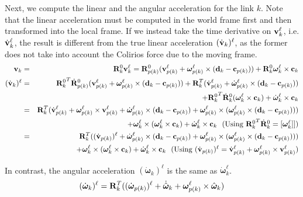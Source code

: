 Next, we compute the linear and the angular acceleration for the link
$k$. Note that the linear acceleration must be computed in the world
frame first and then transformed into the local frame. If we instead
take the time derivative on $\mathbf{v}_k^\ell$,
i.e. $\dot{\mathbf{v}}_k^\ell$, the result is different from the true
linear acceleration $(\dot{\mathbf{v}}_k)^\ell$, as the former does not
take into account the Colirios force due to the moving frame. 
\begin{eqnarray}
\mathbf{v}_k &=& \mathbf{R}^0_k \mathbf{v}_k^\ell = \mathbf{R}^0_{p(k)} (\mathbf{v}_{p(k)}^\ell + \bm{\omega}_{p(k)}^\ell \times
(\mathbf{d}_k -\mathbf{c}_{p(k)})) + \mathbf{R}^0_k \bm{\omega}_k^\ell \times
\mathbf{c}_k \nonumber \\
(\dot{\mathbf{v}}_k)^\ell &=& {\mathbf{R}^0_k}^T \dot{\mathbf{R}}^0_{p(k)}
(\mathbf{v}_{p(k)}^\ell + \bm{\omega}_{p(k)}^\ell \times (\mathbf{d}_k -
\mathbf{c}_{p(k)})) + \mathbf{R}_k^T (\dot{\mathbf{v}}_{p(k)}^\ell +
  \dot{\bm{\omega}}_{p(k)}^\ell \times (\mathbf{d}_k - \mathbf{c}_{p(k)}))
  \nonumber \\ &&+
  {\mathbf{R}^0_k}^T \dot{\mathbf{R}}^0_k (\bm{\omega}_k^\ell \times \mathbf{c}_k)
  + \dot{\bm{\omega}}_k^\ell \times \mathbf{c}_k \nonumber \\
&=& \mathbf{R}_k^T (\dot{\mathbf{v}}_{p(k)}^\ell +
\bm{\omega}_{p(k)}^\ell \times \mathbf{v}_{p(k)}^\ell + \dot{\bm{\omega}}_{p(k)}^\ell \times (\mathbf{d}_k - \mathbf{c}_{p(k)}) + \bm{\omega}_{p(k)}^\ell \times (\bm{\omega}_{p(k)}^\ell \times (\mathbf{d}_k -
\mathbf{c}_{p(k)}))) \nonumber \\ && + \bm{\omega}_k^\ell \times (\bm{\omega}_k^\ell
\times \mathbf{c}_k) + \dot{\bm{\omega}}_k^\ell \times \mathbf{c}_k \mbox{\ \
  (Using ${\mathbf{R}^0_k}^T \dot{\mathbf{R}}^0_k = [\bm{\omega}_k^\ell]]$)} \nonumber \\
&=& \mathbf{R}_k^T ((\dot{\mathbf{v}}_{p(k)})^\ell + \dot{\bm{\omega}}_{p(k)}^\ell \times (\mathbf{d}_k - \mathbf{c}_{p(k)}) + \bm{\omega}_{p(k)}^\ell \times (\bm{\omega}_{p(k)}^\ell \times (\mathbf{d}_k -
\mathbf{c}_{p(k)}))) \nonumber \\ && + \bm{\omega}_k^\ell \times (\bm{\omega}_k^\ell
\times \mathbf{c}_k) + \dot{\bm{\omega}}_k^\ell \times \mathbf{c}_k \mbox{\ \
  (Using ($\dot{\mathbf{v}}_{p(k)})^\ell = \dot{\mathbf{v}}_{p(k)}^\ell +
\bm{\omega}_{p(k)}^\ell \times \mathbf{v}_{p(k)}^\ell$)} 
\end{eqnarray}

In contrast, the angular acceleration $(\dot{\bm{\omega}}_k)^\ell$ is
the same as $\dot{\bm{\omega}}_k^\ell$.
\begin{equation}
(\dot{\bm{\omega}}_k)^\ell = \mathbf{R}_k^T
((\dot{\bm{\omega}}_{p(k)})^\ell + \dot{\hat{\bm{\omega}}}_k +
\bm{\omega}_{p(k)}^\ell \times \hat{\bm{\omega}}_k)
\end{equation}

